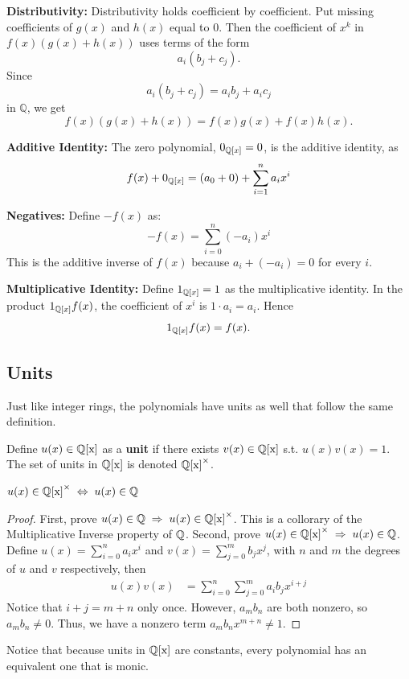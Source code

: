 \noindent\textbf{Distributivity: }
Distributivity holds coefficient by coefficient. Put missing coefficients of
$g(x)$ and $h(x)$ equal to $0$. Then the coefficient of $x^k$ in
$f(x)(g(x)+h(x))$ uses terms of the form
\[
a_i(b_j+c_j).
\]
Since
\[
a_i(b_j+c_j)=a_i b_j+a_i c_j
\]
in $\mathbb{Q}$, we get
\[
f(x)(g(x)+h(x))=f(x)g(x)+f(x)h(x).
\]


\noindent\textbf{Additive Identity: }
The zero polynomial, $0_{\mathbb{Q}[x]} = 0$, is the additive identity, as 
\[
f(x)+0_{\mathbb{Q}[x]}
=(a_0+0)+\sum_{i=1}^n a_ix^i
\]
 
\noindent\textbf{Negatives: }
Define $-f(x)$ as:
\[
-f(x)=\sum_{i=0}^n (-a_i)x^i
\]
This is the additive inverse of $f(x)$ because $a_i+(-a_i)=0$ for every $i$.

\noindent\textbf{Multiplicative Identity: }
Define $1_{\mathbb{Q}[x]} = 1$ as the multiplicative identity. In the product
$1_{\mathbb{Q}[x]}f(x)$, the coefficient of $x^i$ is $1\cdot a_i=a_i$. Hence
\[
1_{\mathbb{Q}[x]}f(x)=f(x).
\]


\subsection{Units}
Just like integer rings, the polynomials have units as well that follow the same definition.
\begin{definition}
    Define $u(x) \in \operatorname{\mathbb{Q}[x]}$ as a \textbf{unit} if there exists $v(x) \in \operatorname{\mathbb{Q}[x]}$ s.t. $u(x)v(x) = 1$. The set of units in $\operatorname{\mathbb{Q}[x]}$ is denoted $\operatorname{\mathbb{Q}[x]}^{\times}$.
\end{definition}
\begin{lemma}
    $u(x) \in \operatorname{\mathbb{Q}[x]}^{\times} \; \Leftrightarrow \; u(x) \in \mathbb{Q}$
\end{lemma}
\begin{proof}
    First, prove $u(x) \in \mathbb{Q} \; \Rightarrow  \; u(x) \in \operatorname{\mathbb{Q}[x]}^{\times}$. This is a collorary of the Multiplicative Inverse property of $\mathbb{Q}$. 
    Second, prove $u(x) \in \operatorname{\mathbb{Q}[x]}^{\times} \; \Rightarrow \; u(x) \in \mathbb{Q}$. Define $u(x)=\sum_{i=0}^{n} a_i x^i$ and $v(x)=\sum_{j=0}^{m} b_j x^j$, with $n$ and $m$ the degrees of $u$ and $v$ respectively, then 
        \begin{align*}
        u(x)v(x)&=\sum_{i=0}^{n} \sum_{j=0}^{m} a_i b_j x^{i+j}
        \end{align*}
        Notice that $i+j = m+n$ only once. However, $a_mb_n$ are both nonzero, so $a_mb_n \neq 0$. Thus, we have a nonzero term $a_mb_nx^{m+n} \neq 1$.  
\end{proof}
Notice that because units in $\operatorname{\mathbb{Q}[x]}$ are constants, every polynomial has an equivalent one that is monic.

